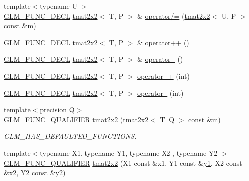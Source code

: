 \begin{DoxyCompactItemize}
\item 
{\footnotesize template$<$typename U $>$ }\\\mbox{\hyperlink{setup_8hpp_ab2d052de21a70539923e9bcbf6e83a51}{G\+L\+M\+\_\+\+F\+U\+N\+C\+\_\+\+D\+E\+CL}} \mbox{\hyperlink{structglm_1_1tmat2x2}{tmat2x2}}$<$ T, P $>$ \& \mbox{\hyperlink{structglm_1_1tmat2x2_a2aa165291397c48680be24491256870e}{operator/=}} (\mbox{\hyperlink{structglm_1_1tmat2x2}{tmat2x2}}$<$ U, P $>$ const \&m)
\item 
\mbox{\hyperlink{setup_8hpp_ab2d052de21a70539923e9bcbf6e83a51}{G\+L\+M\+\_\+\+F\+U\+N\+C\+\_\+\+D\+E\+CL}} \mbox{\hyperlink{structglm_1_1tmat2x2}{tmat2x2}}$<$ T, P $>$ \& \mbox{\hyperlink{structglm_1_1tmat2x2_a9b29f7cc4e8fb411fcb0a7f1c26f5cd2}{operator++}} ()
\item 
\mbox{\hyperlink{setup_8hpp_ab2d052de21a70539923e9bcbf6e83a51}{G\+L\+M\+\_\+\+F\+U\+N\+C\+\_\+\+D\+E\+CL}} \mbox{\hyperlink{structglm_1_1tmat2x2}{tmat2x2}}$<$ T, P $>$ \& \mbox{\hyperlink{structglm_1_1tmat2x2_a3f180d690b3ebc06b9fc6ecc4cbd8349}{operator-\/-\/}} ()
\item 
\mbox{\hyperlink{setup_8hpp_ab2d052de21a70539923e9bcbf6e83a51}{G\+L\+M\+\_\+\+F\+U\+N\+C\+\_\+\+D\+E\+CL}} \mbox{\hyperlink{structglm_1_1tmat2x2}{tmat2x2}}$<$ T, P $>$ \mbox{\hyperlink{structglm_1_1tmat2x2_a6fee5ef9bad6a0fd8edf45063557c188}{operator++}} (int)
\item 
\mbox{\hyperlink{setup_8hpp_ab2d052de21a70539923e9bcbf6e83a51}{G\+L\+M\+\_\+\+F\+U\+N\+C\+\_\+\+D\+E\+CL}} \mbox{\hyperlink{structglm_1_1tmat2x2}{tmat2x2}}$<$ T, P $>$ \mbox{\hyperlink{structglm_1_1tmat2x2_aeddcbe861c53a7dc006001e816da82d6}{operator-\/-\/}} (int)
\item 
{\footnotesize template$<$precision Q$>$ }\\\mbox{\hyperlink{setup_8hpp_a33fdea6f91c5f834105f7415e2a64407}{G\+L\+M\+\_\+\+F\+U\+N\+C\+\_\+\+Q\+U\+A\+L\+I\+F\+I\+ER}} \mbox{\hyperlink{structglm_1_1tmat2x2_a183612b4e6b8300c93d45dc3c1bb6ff2}{tmat2x2}} (\mbox{\hyperlink{structglm_1_1tmat2x2}{tmat2x2}}$<$ T, Q $>$ const \&m)
\begin{DoxyCompactList}\small\item\em G\+L\+M\+\_\+\+H\+A\+S\+\_\+\+D\+E\+F\+A\+U\+L\+T\+E\+D\+\_\+\+F\+U\+N\+C\+T\+I\+O\+NS. \end{DoxyCompactList}\item 
{\footnotesize template$<$typename X1, typename Y1, typename X2 , typename Y2 $>$ }\\\mbox{\hyperlink{setup_8hpp_a33fdea6f91c5f834105f7415e2a64407}{G\+L\+M\+\_\+\+F\+U\+N\+C\+\_\+\+Q\+U\+A\+L\+I\+F\+I\+ER}} \mbox{\hyperlink{structglm_1_1tmat2x2_a49088761b4a3aaef14400d8e5fc51bc8}{tmat2x2}} (X1 const \&x1, Y1 const \&\mbox{\hyperlink{glad_8h_a48340161068d267815ac3131e9d03def}{y1}}, X2 const \&\mbox{\hyperlink{glad_8h_ad2cea6eadb01f017f0d57e7edf0ce988}{x2}}, Y2 const \&\mbox{\hyperlink{glad_8h_af7158b5d27f7a6aa4ab9973fcc3a5c20}{y2}})

\end{DoxyCompactItemize}
